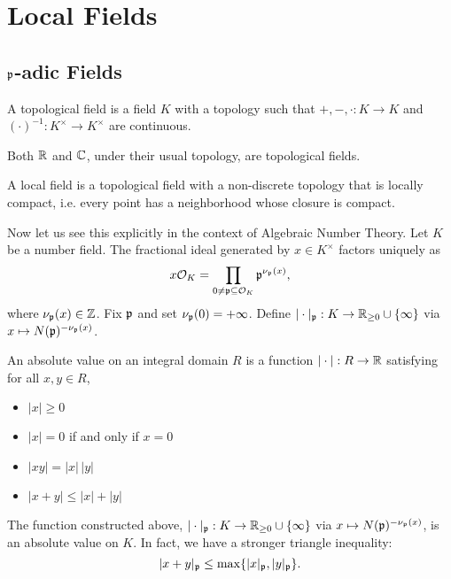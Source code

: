\section{Local Fields}
\subsection{$\mathfrak{p}$-adic Fields}


\begin{dfn}
A topological field is a field $K$ with a topology such that $+,-,\cdot: K \to K$ and $(\cdot)^{-1}: K^\times \to K^\times$ are continuous. 
\end{dfn}

\begin{ex}
Both $\mathbb{R}$ and $\mathbb{C}$, under their usual topology, are topological fields. \xqed
\end{ex}

\begin{dfn}
A local field is a topological field with a non-discrete topology that is locally compact, i.e. every point has a neighborhood whose closure is compact. 
\end{dfn}

Now let us see this explicitly in the context of Algebraic Number Theory. Let $K$ be a number field. The fractional ideal generated by $x \in K^\times$ factors uniquely as
	\[
	x \mathcal{O}_K= \prod_{0 \neq \mathfrak{p} \subseteq \mathcal{O}_K} \mathfrak{p}^{\nu_{\mathfrak{p}}(x)},
	\]
where $\nu_{\mathfrak{p}}(x) \in \mathbb{Z}$. Fix $\mathfrak{p}$ and set $\nu_{\mathfrak{p}}(0)=+\infty$. Define $|\cdot|_{\mathfrak{p}}: K \to \mathbb{R}_{\geq 0} \cup \{\infty\}$ via $x \mapsto N(\mathfrak{p})^{-\nu_{\mathfrak{p}}(x)}$.

\begin{dfn}
An absolute value on an integral domain $R$ is a function $|\cdot|: R \to \mathbb{R}$ satisfying for all $x,y \in R$,
\begin{itemize}
\item $|x| \geq 0$
\item $|x|=0$ if and only if $x=0$
\item $|xy|= |x|\,|y|$
\item $|x+y| \leq |x|+|y|$
\end{itemize}
\end{dfn}

\begin{ex}
The function constructed above, $|\cdot|_{\mathfrak{p}}: K \to \mathbb{R}_{\geq 0} \cup \{\infty\}$ via $x \mapsto N(\mathfrak{p})^{-\nu_{\mathfrak{p}}(x)}$, is an absolute value on $K$. In fact, we have a stronger triangle inequality:
	\[
	|x+y|_{\mathfrak{p}} \leq \max\{|x|_{\mathfrak{p}}, |y|_{\mathfrak{p}}\}.
	\]
\end{ex}

